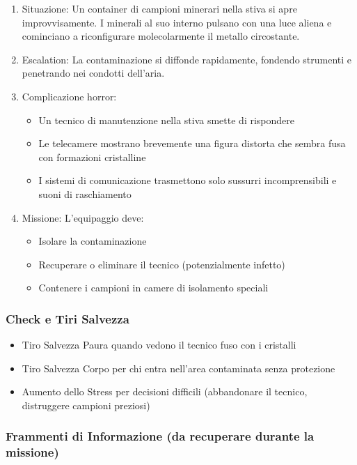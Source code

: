 \documentclass[letterpaper,twocolumn,openany,nodeprecatedcode]{dndbook}
\begin{document}
\begin{enumerate}
\item Situazione: Un container di campioni minerari nella stiva si apre improvvisamente. I minerali al suo interno pulsano con una luce aliena e cominciano a riconfigurare molecolarmente il metallo circostante.
\item Escalation: La contaminazione si diffonde rapidamente, fondendo strumenti e penetrando nei condotti dell'aria.
\item Complicazione horror:

\begin{itemize}
    \item Un tecnico di manutenzione nella stiva smette di rispondere
\item Le telecamere mostrano brevemente una figura distorta che sembra fusa con formazioni cristalline
\item I sistemi di comunicazione trasmettono solo sussurri incomprensibili e suoni di raschiamento
\end{itemize}

    \item Missione: L'equipaggio deve:

\begin{itemize}
    \item Isolare la contaminazione
    \item Recuperare o eliminare il tecnico (potenzialmente infetto)
    \item Contenere i campioni in camere di isolamento speciali
\end{itemize}

\end{enumerate}

\subsubsection{Check e Tiri Salvezza}

\begin{itemize}
    \item Tiro Salvezza Paura quando vedono il tecnico fuso con i cristalli
    \item Tiro Salvezza Corpo per chi entra nell'area contaminata senza protezione
    \item Aumento dello Stress per decisioni difficili (abbandonare il tecnico, distruggere campioni preziosi)
\end{itemize}

\subsubsection{Frammenti di Informazione (da recuperare durante la missione)}
\end{document}
